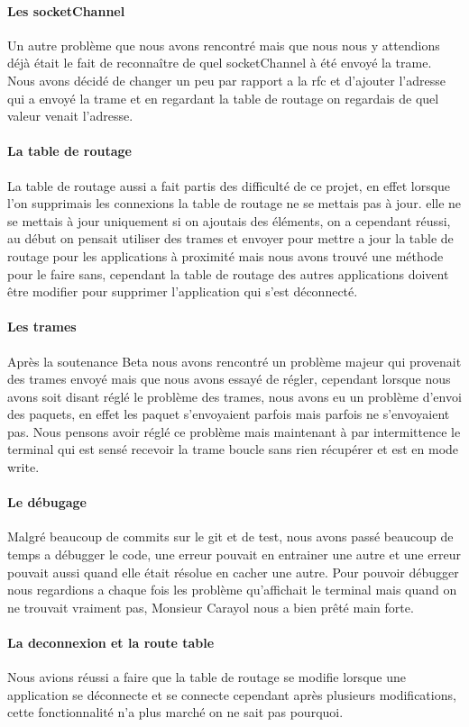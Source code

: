 \documentclass[a4paper,titlepage]{report}
\begin{document}
\paragraph{Les socketChannel}
Un autre problème que nous avons rencontré mais que nous nous y attendions déjà était le fait de reconnaître de quel socketChannel à été envoyé la trame.
Nous avons décidé de changer un peu par rapport a la rfc et d'ajouter l'adresse qui a envoyé la trame et en regardant la table de routage on regardais de quel valeur venait l'adresse.
\paragraph{La table de routage}
La table de routage aussi a fait partis des difficulté de ce projet, en effet lorsque l'on supprimais les connexions la table de routage ne se mettais pas à jour. elle ne se mettais à jour uniquement si on ajoutais des éléments, on a cependant réussi, au début on pensait utiliser des trames et envoyer pour mettre a jour la table de routage pour les applications à proximité mais nous avons trouvé une méthode pour le faire sans, cependant la table de routage des autres applications doivent être modifier pour supprimer l'application qui s'est déconnecté.
\paragraph{Les trames}
Après la soutenance Beta nous avons rencontré un problème majeur qui provenait des trames envoyé mais que nous avons essayé de régler, cependant lorsque nous avons soit disant réglé le problème des trames, nous avons eu un problème d'envoi des paquets, en effet les paquet s'envoyaient parfois mais parfois ne s'envoyaient pas.
Nous pensons avoir réglé ce problème mais maintenant à par intermittence le terminal qui est sensé recevoir la trame boucle sans rien récupérer et est en mode write.
\paragraph{Le débugage}
Malgré beaucoup de commits sur le git et de test, nous avons passé beaucoup de temps a débugger le code, une erreur pouvait en entrainer une autre et une erreur pouvait aussi quand elle était résolue en cacher une autre. Pour pouvoir débugger nous regardions a chaque fois les problème qu'affichait le terminal mais quand on ne trouvait vraiment pas, Monsieur Carayol nous a bien prêté main forte. 
\paragraph{La deconnexion et la route table}
Nous avions réussi a faire que la table de routage se modifie lorsque une application se déconnecte et se connecte cependant après plusieurs modifications, cette fonctionnalité n'a plus marché on ne sait pas pourquoi.
\end{document}
